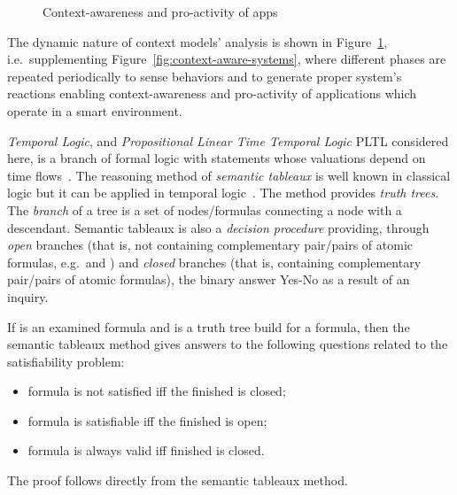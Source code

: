 \documentclass[runningheads,a4paper]{llncs}
\begin{document}
\begin{figure}[htb]
\centering
{}
\caption{Context-awareness and pro-activity of apps}
\label{fig:app}
\end{figure}
The dynamic nature of context models' analysis is shown in Figure~\ref{fig:app},
i.e.\ supplementing Figure~\ref{fig:context-aware-systems},
where different phases are repeated periodically to sense behaviors and
to generate proper system's reactions
enabling context-awareness and pro-activity of applications which operate
in a smart environment.

\emph{Temporal Logic},
and \emph{Propositional Linear Time Temporal Logic} PLTL considered here,
is a branch of formal logic with statements whose valuations depend on
time flows~\cite{Wolter-Wooldridge-2011}.
The reasoning method of \emph{semantic tableaux}
is well known in classical logic but it can be applied in temporal logic~\cite{Hahnle-2001,Klimek-2014-AMCS}.
The method provides \emph{truth trees}.
The \emph{branch} of a tree is a set of nodes/formulas connecting a node with a descendant.
Semantic tableaux is also a \emph{decision procedure} providing,
through \emph{open} branches
(that is, not containing complementary pair/pairs of atomic formulas, e.g.\  and ) and
\emph{closed} branches
(that is, containing complementary pair/pairs of atomic formulas),
the binary answer Yes-No as a result of an inquiry.
\begin{corollary}
\label{th:decision-procedures}
If  is an examined formula and  is a truth tree build for a formula,
then the semantic tableaux method gives answers to the following questions related to the satisfiability problem:
\begin{itemize}
\item formula  is not satisfied iff the finished  is closed;
\item formula  is satisfiable iff the finished  is open;
\item formula  is always  valid iff finished  is closed.
\end{itemize}
\end{corollary}
The proof follows directly from the semantic tableaux method.
\end{document}
